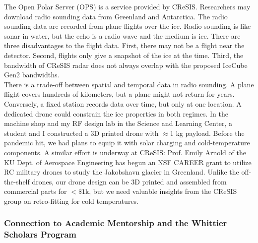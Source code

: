 \documentclass[../../../main.tex]{subfiles}
\begin{document}
The Open Polar Server (OPS) is a service provided by CReSIS.  Researchers may download radio sounding data from Greenland and Antarctica.  The radio sounding data are recorded from plane flights over the ice.  Radio sounding is like sonar in water, but the echo is a radio wave and the medium is ice.  There are three disadvantages to the flight data.  First, there may not be a flight near the detector.  Second, flights only give a snapshot of the ice at the time.  Third, the bandwidth of CReSIS radar does not always overlap with the proposed IceCube Gen2 bandwidths.
\\
\vspace{0.25cm}
There is a trade-off between spatial and temporal data in radio sounding.  A plane flight covers hundreds of kilometers, but a plane might not return for years.  Conversely, a fixed station records data over time, but only at one location.  A dedicated drone could constrain the ice properties in both regimes.  In the machine shop and my RF design lab in the Science and Learning Center, a student and I constructed a 3D printed drone with $\approx 1$ kg payload.  Before the pandemic hit, we had plans to equip it with solar charging and cold-temperature components.  A similar effort is underway at CReSIS: Prof. Emily Arnold of the KU Dept. of Aerospace Engineering has begun an NSF CAREER grant to utilize RC military drones to study the Jakobshavn glacier in Greenland.  Unlike the off-the-shelf drones, our drone design can be 3D printed and assembled from commercial parts for $< \$1$k, but we need valuable insights from the CReSIS group on retro-fitting for cold temperatures.

\subsubsection{Connection to Academic Mentorship and the Whittier Scholars Program}
\end{document}
